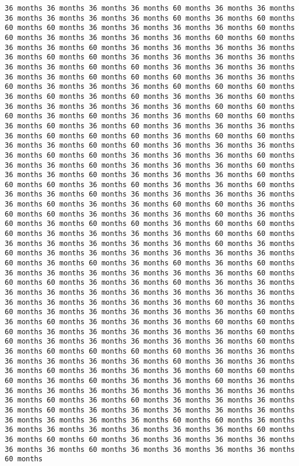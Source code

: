 \documentclass[11pt]{article}
\begin{document}
\begin{Verbatim}[commandchars=\\\{\}, frame=single, framerule=2mm, rulecolor=\color{outerrorbackground}]
36 months 36 months 36 months 36 months 60 months 36 months 36 months 36 months 36 months 36 months 36 months 60 months 36 months 60 months 60 months 60 months 36 months 36 months 36 months 36 months 60 months 60 months 36 months 36 months 36 months 36 months 60 months 60 months 36 months 36 months 60 months 36 months 36 months 36 months 36 months 36 months 60 months 60 months 36 months 36 months 36 months 36 months 36 months 36 months 60 months 60 months 36 months 36 months 36 months 36 months 36 months 60 months 60 months 60 months 36 months 36 months 60 months 36 months 36 months 36 months 60 months 60 months 60 months 36 months 60 months 36 months 60 months 36 months 36 months 60 months 36 months 36 months 36 months 36 months 36 months 60 months 60 months 60 months 36 months 60 months 36 months 36 months 60 months 60 months 36 months 60 months 36 months 60 months 36 months 36 months 36 months 36 months 60 months 60 months 60 months 36 months 60 months 60 months 36 months 36 months 60 months 60 months 36 months 36 months 36 months 36 months 60 months 60 months 36 months 36 months 36 months 60 months 36 months 36 months 60 months 36 months 36 months 36 months 60 months 36 months 36 months 60 months 36 months 36 months 36 months 60 months 60 months 60 months 36 months 60 months 36 months 36 months 60 months 36 months 36 months 60 months 36 months 36 months 36 months 36 months 36 months 60 months 36 months 36 months 60 months 60 months 36 months 60 months 60 months 36 months 36 months 36 months 60 months 36 months 60 months 36 months 60 months 60 months 36 months 60 months 60 months 60 months 36 months 36 months 36 months 36 months 60 months 60 months 36 months 36 months 36 months 36 months 36 months 60 months 36 months 60 months 36 months 36 months 36 months 36 months 36 months 36 months 60 months 36 months 60 months 36 months 60 months 36 months 60 months 36 months 36 months 36 months 36 months 36 months 36 months 60 months 60 months 60 months 36 months 36 months 60 months 36 months 36 months 36 months 36 months 36 months 36 months 36 months 36 months 36 months 36 months 36 months 36 months 36 months 36 months 60 months 36 months 60 months 36 months 36 months 36 months 36 months 36 months 60 months 36 months 60 months 36 months 36 months 36 months 60 months 60 months 60 months 36 months 36 months 36 months 36 months 36 months 60 months 60 months 36 months 36 months 36 months 36 months 36 months 60 months 36 months 60 months 60 months 60 months 60 months 36 months 36 months 36 months 36 months 36 months 36 months 60 months 36 months 36 months 36 months 60 months 36 months 36 months 36 months 60 months 60 months 60 months 36 months 60 months 36 months 36 months 60 months 36 months 36 months 36 months 36 months 36 months 36 months 36 months 36 months 36 months 60 months 36 months 60 months 36 months 36 months 36 months 36 months 60 months 36 months 36 months 36 months 36 months 36 months 36 months 36 months 36 months 36 months 60 months 60 months 36 months 36 months 36 months 36 months 36 months 36 months 36 months 60 months 36 months 60 months 60 months 36 months 36 months 36 months 36 months 36 months 36 months 60 months 36 months 36 months 36 months 36 months 60 months 
\end{Verbatim}
\end{document}
